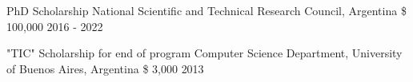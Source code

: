 
\begin{cvhonors}

  \cvhonor
    {PhD Scholarship} %
    {National Scientific and Technical Research Council, Argentina} %
    {\$ 100,000} %
    {2016 - 2022} %

  \cvhonor
    {"TIC" Scholarship for end of program} %
    {Computer Science Department, University of Buenos Aires, Argentina} %
    {\$ 3,000} %
    {2013} %

\end{cvhonors}

